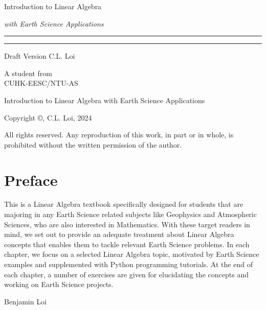 \begin{titlepage}
    {\Huge\raggedright Introduction to Linear Algebra \par}
    {\Large\raggedright \textit{with Earth Science Applications} \hfill\textcolor{Mahogany}{\rule{3mm}{3mm}} \par}
    \vspace{3mm}\hrule\par
    {\Large\raggedleft Draft Version \hfill C.L. Loi \par}
    \vfill
    {\Large\raggedleft A student from\\
    CUHK-EESC/NTU-AS \par}
\end{titlepage}
\begin{titlepage}
\begin{center}
Introduction to Linear Algebra with Earth Science Applications

Copyright ©, C.L. Loi, 2024 

All rights reserved. Any reproduction of this work, in part or in whole, is prohibited without the written permission of the author.
\end{center}
\end{titlepage}
\newpage


\chapter*{Preface}
This is a Linear Algebra textbook specifically designed for students that are majoring in any Earth Science related subjects like Geophysics and Atmospheric Sciences, who are also interested in Mathematics. With these target readers in mind, we set out to provide an adequate treatment about Linear Algebra concepts that enables them to tackle relevant Earth Science problems. In each chapter, we focus on a selected Linear Algebra topic, motivated by Earth Science examples and supplemented with Python programming tutorials. At the end of each chapter, a number of exercises are given for elucidating the concepts and working on Earth Science projects. \par
{\raggedleft Benjamin Loi \par}

\tableofcontents